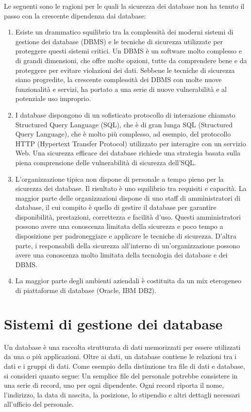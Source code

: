 Le seguenti sono le ragioni per le quali la sicurezza dei database non ha tenuto il passo con la crescente dipendenza dai database:
\begin{enumerate}
    \item Esiste un drammatico squilibrio tra la complessità dei moderni sistemi di gestione dei database (DBMS) e le tecniche di sicurezza utilizzate per proteggere questi sistemi critici. Un DBMS è un software molto complesso e di grandi dimensioni, che offre molte opzioni, tutte da comprendere bene e da proteggere per evitare violazioni dei dati. Sebbene le tecniche di sicurezza siano progredite, la crescente complessità dei DBMS con molte nuove funzionalità e servizi, ha portato a una serie di nuove vulnerabilità e al potenziale uso improprio.
    
    \item I database dispongono di un sofisticato protocollo di interazione chiamato Structured Query Language (SQL), che è di gran lunga SQL (Structured Query Language), che è molto più complesso, ad esempio, del protocollo HTTP (Hypertext Transfer Protocol) utilizzato per interagire con un servizio Web. Una sicurezza efficace dei database richiede una strategia basata sulla piena comprensione delle vulnerabilità di sicurezza dell'SQL.
    
    \item L'organizzazione tipica non dispone di personale a tempo pieno per la sicurezza dei database. Il risultato è uno squilibrio tra requisiti e capacità. La maggior parte delle organizzazioni dispone di uno staff di amministratori di database, il cui compito è quello di gestire il database per garantire disponibilità, prestazioni, correttezza e facilità d'uso. Questi amministratori possono avere una conoscenza limitata della sicurezza e poco tempo a disposizione per padroneggiare e applicare le tecniche di sicurezza. D'altra parte, i responsabili della sicurezza all'interno di un'organizzazione possono avere una conoscenza molto limitata della tecnologia dei database e dei DBMS.
    
    \item La maggior parte degli ambienti aziendali è costituita da un mix eterogeneo di piattaforme di database (Oracle, IBM DB2).
\end{enumerate}
\section{Sistemi di gestione dei database}
Un database è una raccolta strutturata di dati memorizzati per essere utilizzati da una o più applicazioni. Oltre ai dati, un database contiene le relazioni tra i dati e i gruppi di dati. Come esempio della distinzione tra file di dati e database, si consideri quanto segue: Un semplice file del personale potrebbe consistere in una serie di record, uno per ogni dipendente. Ogni record riporta il nome, l'indirizzo, la data di nascita, la posizione, lo stipendio e altri dettagli necessari all'ufficio del personale.


